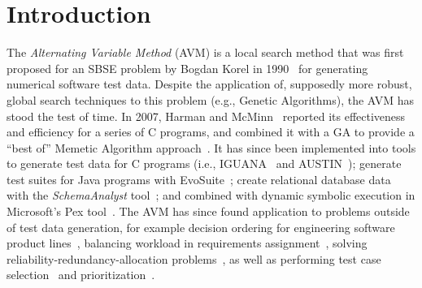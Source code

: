\documentclass{llncs}
\newcommand{\AVM}{Alternating Variable Method\xspace}
\begin{document}
\section{Introduction}
\vspace{-1em}
The {\it \AVM\/} (AVM) is a local search method that was first proposed for an SBSE problem by Bogdan Korel in 1990~\cite{Korel1990}
for generating \mbox{numerical} software test data.
Despite the application of, supposedly more robust, global search techniques to this problem (e.g., Genetic Algorithms),
the AVM has stood the test of time. In 2007, Harman and McMinn~\cite{Harman2007} reported its effectiveness and
efficiency for a series of C programs, and combined it with a GA to provide a ``best of'' Memetic Algorithm
approach~\cite{Harman2010}. It has since been implemented into tools to generate test data for C programs (i.e.,
IGUANA~\cite{McMinn2007} and AUSTIN~\cite{Lakhotia2010,Lakhotia2013}); generate test suites for Java programs with {\sc
EvoSuite}~\cite{Fraser2013,Fraser2015b}; create relational database data with the {\it SchemaAnalyst\/} tool~\cite{Kapfhammer2013,McMinn2015}; and combined with dynamic symbolic execution in Microsoft's Pex tool~\cite{Lakhotia2010b}.
The AVM has since found application to problems outside of test data generation, for example
%
decision ordering for engineering software product lines~\cite{Yue2016}, %
%
balancing workload in requirements assignment~\cite{Yue2014}, %
%
solving reliability-redundancy-allocation problems~\cite{Qiu2016}, %
%
as well as performing test case selection~\cite{Pradhan2016} and prioritization~\cite{Arrieta2016}. %
\end{document}
